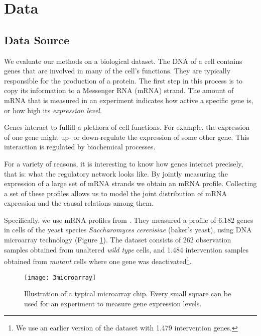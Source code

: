 \newpage
\section{Data}


\subsection{Data Source}

We evaluate our methods on a biological dataset. The DNA of a cell contains genes that are involved in many of the cell's functions. They are typically responsible for the production of a protein. The first step in this process is to copy its information to a Messenger RNA (mRNA) strand. The amount of mRNA that is measured in an experiment indicates how active a specific gene is, or how high its \textit{expression level}.

Genes interact to fulfill a plethora of cell functions. For example, the expression of one gene might up- or down-regulate the expression of some other gene. This interaction is regulated by biochemical processes. 

For a variety of reasons, it is interesting to know how genes interact precisely, that is: what the regulatory network looks like. By jointly measuring the expression of a large set of mRNA strands we obtain an mRNA profile. Collecting a set of these profiles allows us to model the joint distribution of mRNA expression and the causal relations among them.

Specifically, we use mRNA profiles from \citet{kemmeren2014large}. They measured a profile of 6.182 genes in cells of the yeast species \textit{Saccharomyces cerevisiae} (baker's yeast), using DNA microarray technology (Figure \ref{fig:3:microarray}). The dataset consists of 262 observation samples obtained from unaltered \textit{wild type} cells, and 1.484 intervention samples obtained from \textit{mutant} cells where one gene was deactivated\footnote{We use an earlier version of the dataset with 1.479 intervention genes.}.

\begin{figure}[h]
    \centering
    \texttt{[image: 3microarray]}
    \caption{Illustration of a typical microarray chip. Every small square can be used for an experiment to measure gene expression levels.\protect\footnotemark}
    \label{fig:3:microarray}
\end{figure}

